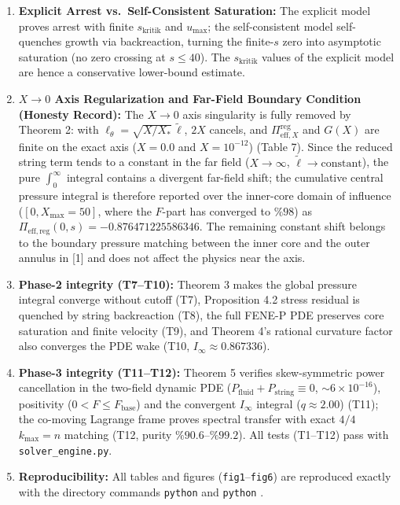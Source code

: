 \documentclass[12pt,a4paper]{article}
\begin{document}
\begin{enumerate}
    \item \textbf{Explicit Arrest vs.\ Self-Consistent Saturation:} The explicit model proves arrest with finite $s_{\mathrm{kritik}}$ and $u_{\max}$; the self-consistent model self-quenches growth via backreaction, turning the finite-$s$ zero into asymptotic saturation (no zero crossing at $s \le 40$). The $s_{\mathrm{kritik}}$ values of the explicit model are hence a conservative lower-bound estimate.
    \item \textbf{$X \to 0$ Axis Regularization and Far-Field Boundary Condition (Honesty Record):} The $X \to 0$ axis singularity is fully removed by Theorem 2: with $\ell_\theta = \sqrt{X/X_*}\,\tilde{\ell}$, $2X$ cancels, and $\Pi_{\mathrm{eff}, X}^{\mathrm{reg}}$ and $G(X)$ are finite on the exact axis ($X=0.0$ and $X=10^{-12}$) (Table 7). Since the reduced string term tends to a constant in the far field ($X \to \infty$, $\tilde{\ell} \to \text{constant}$), the pure $\int_0^\infty$ integral contains a divergent far-field shift; the cumulative central pressure integral is therefore reported over the inner-core domain of influence ($[0, X_{\max}=50]$, where the $F$-part has converged to $\%98$) as $\Pi_{\mathrm{eff,reg}}(0,s) = -0.876471225586346$. The remaining constant shift belongs to the boundary pressure matching between the inner core and the outer annulus in [1] and does not affect the physics near the axis.
    \item \textbf{Phase-2 integrity (T7--T10):} Theorem 3 makes the global pressure integral converge without cutoff (T7), Proposition 4.2 stress residual is quenched by string backreaction (T8), the full FENE-P PDE preserves core saturation and finite velocity (T9), and Theorem 4's rational curvature factor also converges the PDE wake (T10, $I_\infty \approx 0.867336$).
    \item \textbf{Phase-3 integrity (T11--T12):} Theorem 5 verifies skew-symmetric power cancellation in the two-field dynamic PDE ($P_{\mathrm{fluid}} + P_{\mathrm{string}} \equiv 0$, $\sim 6 \times 10^{-16}$), positivity ($0 < F \le F_{\mathrm{base}}$) and the convergent $I_\infty$ integral ($q \approx 2.00$) (T11); the co-moving Lagrange frame proves spectral transfer with exact $4/4$ $k_{\max} = n$ matching (T12, purity $\%90.6\text{--}\%99.2$). All tests (T1--T12) pass with \texttt{solver\_engine.py}.
    \item \textbf{Reproducibility:} All tables and figures (\texttt{fig1}--\texttt{fig6}) are reproduced exactly with the  directory commands \texttt{python}  and \texttt{python} .
\end{enumerate}
\end{document}
